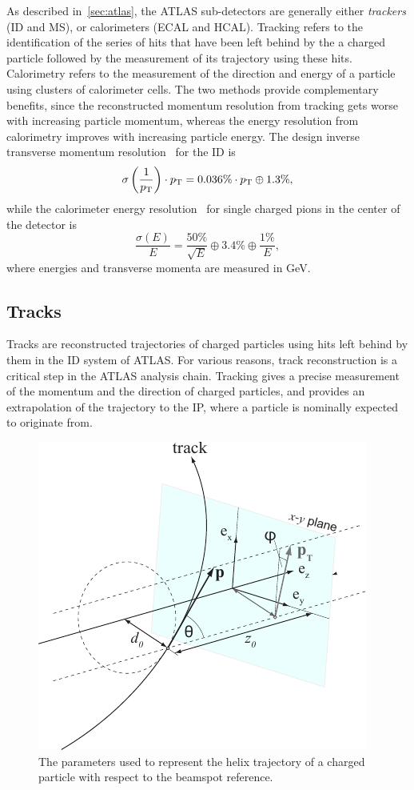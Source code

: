 As described in~\cref{sec:atlas}, the ATLAS sub-detectors are generally either \textit{trackers} (ID and MS), or calorimeters (ECAL and HCAL). Tracking refers to the identification of the series of hits that have been left behind by the a charged particle followed by the measurement of its trajectory using these hits. Calorimetry refers to the measurement of the direction and energy of a particle using clusters of calorimeter cells. The two methods provide complementary benefits, since the reconstructed momentum resolution from tracking gets worse with increasing particle momentum, whereas the energy resolution from calorimetry improves with increasing particle energy. The design inverse transverse momentum resolution~\cite{PERF-2015-09} for the ID is
\begin{equation}
    \sigma \left( \frac{1}{p_\mathrm{T}} \right) \cdot p_\mathrm{T} = 0.036\% \cdot p_\mathrm{T} \oplus 1.3\% ,
\end{equation}
while the calorimeter energy resolution~\cite{PERF-2015-09} for single charged pions in the center of the detector is
\begin{equation}
    \frac{\sigma\left(E\right)}{E}=\frac{50\%}{\sqrt{E}}\oplus3.4\%\oplus\frac{1\%}{E},
\end{equation}
where energies and transverse momenta are measured in GeV.

\subsection{Tracks}

Tracks are reconstructed trajectories of charged particles using hits left behind by them in the ID system of ATLAS. For various reasons, track reconstruction is a critical step in the ATLAS analysis chain. Tracking gives a precise measurement of the momentum and the direction of charged particles, and provides an extrapolation of the trajectory to the IP, where a particle is nominally expected to originate from. 

\begin{figure}[!ht]
    \centering
    \includegraphics[width=0.6\linewidth]{figures/experiment/trackCoordinates.pdf}
    \caption{The parameters used to represent the helix trajectory of a charged particle with respect to the beamspot reference.~\cite{trk-tutorial-web}}
    \label{fig:track-coords}
\end{figure}

